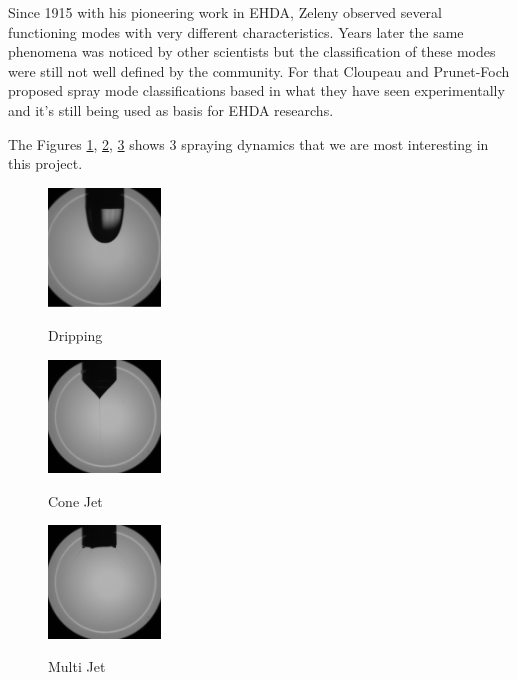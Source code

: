 Since 1915 with his pioneering work in EHDA, Zeleny observed several functioning modes with very different characteristics.
Years later the same phenomena was noticed by other scientists but the classification of these modes were still not well defined by the community.
For that Cloupeau and Prunet-Foch proposed spray mode classifications based in what they have seen experimentally and it's still being used as basis for EHDA researchs.\cite{prunet}

The Figures \ref{fig:dripping_camera_example}, \ref{fig:cone_camera_jet_example}, \ref{fig:multi_camera_jet_example} shows 3 spraying dynamics that we are most interesting in this project. 

\begin{multicols}{3}

  \begin{figure}[H]
      \center
      \includegraphics[width=3cm]{Figuras/drippingexample.png}
      \label{fig:dripping_camera_example}
      \caption{Dripping}
  \end{figure}


  \begin{figure}[H]
      \center
      \includegraphics[width=3cm]{Figuras/conejetexample.png}
      \label{fig:cone_camera_jet_example}
      \caption{Cone Jet}
  \end{figure}


  \begin{figure}[H]
      \center
      \includegraphics[width=3cm]{Figuras/multijetexample.png}
      \label{fig:multi_camera_jet_example}
      \caption{Multi Jet}
  \end{figure}

\end{multicols}


